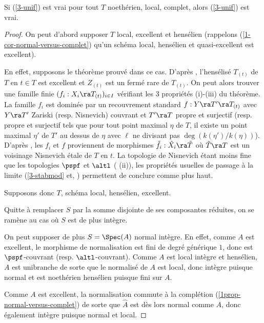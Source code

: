 \documentclass[10pt]{../fichiers-configuration-latex/smfart}
\begin{document}
 \begin{proposition}\label{3-reduc} Si (\ref{3-unif}) est vrai pour
 tout $T$ noethérien, local, complet, alors (\ref{3-unif}) est vrai.
  \end{proposition}
\begin{proof} On peut d'abord supposer  $T$ local, excellent et
hensélien (rappelons (\ref{1-cor-normal-versus-complet}) qu'un
schéma local, hensélien et quasi-excellent est excellent).

En effet, supposons le théorème prouvé dans ce cas. D'après
, l'hensélisé $T_{(t)}$ de $T$ en $t\in T$
est excellent et $Z_{(t)}$ est un fermé rare de $T_{(t)}$. On peut
alors trouver une famille finie $(f_i:X_i\ra T_{(t)})_{i\in I}$
vérifiant les 3 propriétés (i)-(iii) du théorème. La famille
$f_i$ est dominée par un recouvrement standard $f:Y\ra T'\ra
T_{(t)}$ avec $Y\ra T'$ Zariski (resp. Nisnevich) couvrant et
$T'\ra T$ propre et surjectif (resp. propre et surjectif tels que
pour tout point maximal $\eta$ de $T$, il existe un point maximal
$\eta'$ de $T'$ au dessus de $\eta$ avec  $\ell$ ne divisant pas
$\deg(k(\eta')/k(\eta))$). D'après , les $f_i$
et $f$ proviennent de morphismes $\tilde f_i:\tilde X_i\ra \tilde
T$ où  $\tilde T\ra T$ est un voisinage Nisnevich étale de $T$ en
$t$. La topologie de Nisnevich étant moins fine que les topologies
$\pspf$ et $\altl$ ( (ii)), les propriétés usuelles de passage à la limite
(\ref{3-stabmod} et, )
permettent de conclure comme plus haut.

Supposons donc $T$, schéma local, hensélien, excellent.

Quitte à remplacer $S$ par la somme disjointe de ses composantes
réduites, on se ramène au cas où $S$ est de plus intègre.

On peut supposer de plus $S=\Spec(A)$ normal intègre. En
effet, comme $A$ est excellent, le morphisme de normalisation
est fini de degré générique $1$, donc est $\pspf$-couvrant
(resp. $\altl$-couvrant). Comme $A$ est local intègre et hensélien,
$A$ est unibranche de sorte que le normalisé de $A$ est local,
donc intègre puisque normal et est noethérien hensélien puisque
fini sur $A$.

Comme $A$ est excellent, la normalisation commute à la complétion
(\ref{1prop-normal-versus-complet}) de sorte que $\hat A$ est dès
lors normal comme $A$, donc également intègre puisque normal
et local.


\end{proof}
\end{document}
